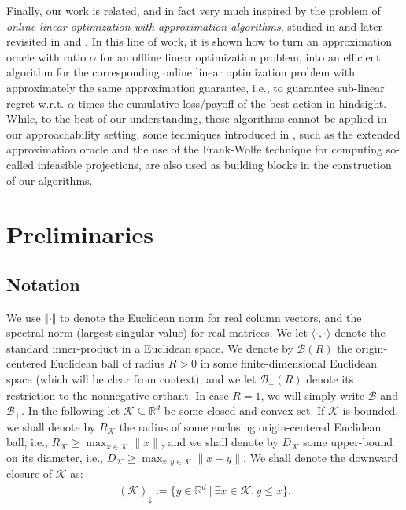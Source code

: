 \documentclass[a4paper,12pt]{article}
\newcommand{\mB}{\mathcal{B}}
\newcommand{\mK}{\mathcal{K}}
\newcommand{\reals}{\mathbb{R}}
\begin{document}
Finally, our work is  related, and in fact very much inspired by the problem of \textit{online linear optimization with approximation algorithms}, studied   in \cite{kakade2007playing} and later revisited in \cite{garber2017efficient} and \cite{hazan2018online}. In this line of work, it is shown how to turn an approximation oracle with ratio $\alpha$ for an offline linear optimization problem, into an efficient algorithm for the corresponding online linear optimization problem with approximately the same approximation guarantee, i.e.,  to guarantee sub-linear regret w.r.t. $\alpha$ times the cumulative loss/payoff of the best action in hindsight. While, to the best of our understanding, these algorithms cannot be applied in our approachability setting, some techniques introduced in \cite{kakade2007playing}, such as the extended approximation oracle and the use of the Frank-Wolfe technique for computing so-called infeasible projections, are also used as building blocks in the construction of our algorithms. 




\section{Preliminaries}
\subsection{Notation}
We use $\Vert{\cdot}\Vert$ to denote the Euclidean norm for real column vectors, and the spectral norm (largest singular value) for real matrices. We let $\langle{\cdot,\cdot}\rangle$ denote the standard inner-product in a Euclidean space. 
We denote by $\mB(R)$ the origin-centered Euclidean ball of radius $R>0$ in some finite-dimensional Euclidean space (which will be clear from context), and we let $\mB_+(R)$ denote its restriction to the nonnegative orthant. In case $R=1$, we will simply write $\mB$ and $\mB_+$. 
In the following let $\mK\subseteq\reals^d$ be some closed and convex set.
If $\mK$ is bounded,  we shall denote by $R_{\mK}$ the radius of some enclosing origin-centered Euclidean ball, i.e., $R_{\mK}\geq \max_{x \in \mK} \|x\|$, and we shall denote by $D_{\mK}$ some upper-bound on its diameter, i.e., $D_{\mK}\geq \max_{x,y \in \mK} \|x-y\|$.
We shall denote the downward closure of $\mK$ as:
\begin{align*}
 (\mK)_{\downarrow} := \{y\in\reals^d ~|~\exists x\in\mK: y\leq x\}.
\end{align*}
\end{document}
